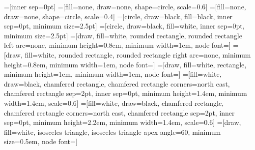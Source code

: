 \newcommand{\xnor}{\tikzfig{tapes/cipriano/xnorgatealone}}


\newcommand{\PreCatTapeI}[1]{\Cat{T}_{\sign,#1}} %
\newcommand{\posetification}[1]{#1^\sim}
\newcommand{\CatTapeI}[1]{\posetification{\PreCatTapeI{#1}} } %
\newcommand{\extendedAX}{\tape{\basicR}}
\newcommand{\CatTapeIGamma}[1]{\posetification{\Cat{T}_{\Gamma,#1}}}
\newcommand{\downsetification}[1]{{#1}^\downarrow}
\newcommand{\downward}[1]{#1\downarrow}

\newcommand{\CR}{\mathsf{CR}}
\newcommand{\CRS}{\mathsf{CR}_{\sign}}
\newcommand{\encoding}[1]{\mathcal{E}(#1)}
\newcommand{\minorExpression}{\leq_{\CR}}

\newcommand{\minorinTCB}{\leq_{T}}
\newcommand{\minorinCB}{\leq_{\CB}}


\newcommand{\PreCatTrTapeI}[1]{\Cat{Tr}_{\sign,#1}}


\usepackage{tikz}
\usetikzlibrary{cd,arrows,backgrounds,shapes.geometric,shapes.misc,matrix,arrows.meta,decorations.markings}

\tikzset{baseline=-0.5ex,>=stealth'}
=[inner sep=0pt]
=[fill=none, draw=none, shape=circle, scale=0.6]
=[fill=none, draw=none, shape=circle, scale=0.4]
=[circle, draw=black, fill=black, inner sep=0pt, minimum size=2.5pt]
=[circle, draw=black, fill=white, inner sep=0pt, minimum size=2.5pt]
=[draw, fill=white, rounded rectangle, rounded rectangle left arc=none, minimum height=0.8em, minimum width=1em, node font={\tiny}]
=[draw, fill=white, rounded rectangle, rounded rectangle right arc=none, minimum height=0.8em, minimum width=1em, node font={\tiny}]
=[draw, fill=white, rectangle, minimum height=1em, minimum width=1em, node font={\tiny}]
=[fill=white, draw=black, chamfered rectangle, chamfered rectangle corners={north east}, chamfered rectangle sep=2pt, inner sep=0pt, minimum height=1.4em, minimum width=1.4em, scale=0.6]
=[fill=white, draw=black, chamfered rectangle, chamfered rectangle corners={north east}, chamfered rectangle sep=2pt, inner sep=0pt, minimum height=2.2em, minimum width=1.4em, scale=0.6]
=[draw, fill=white, isosceles triangle, isosceles triangle apex angle=60, minimum size=0.5em, node font={\tiny}]

